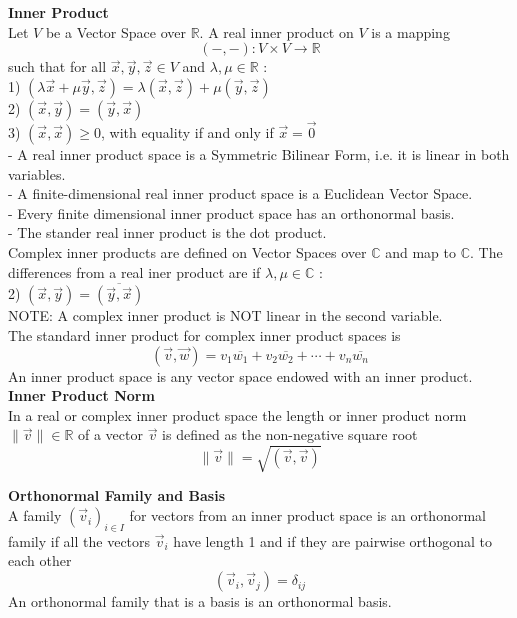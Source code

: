 \documentclass[a4paper, 10pt]{article}
\begin{document}
\begin{multicols*}{3}
\textbf{Inner Product}\\
Let $V$ be a Vector Space over $\mathbb{R}$. A real inner product on $V$ is a mapping
$$
(-,-): V \times V \rightarrow \mathbb{R}
$$
such that for all $\vec{x}, \vec{y}, \vec{z} \in V$ and $\lambda, \mu \in \mathbb{R}$ :\\
1) $(\lambda \vec{x}+\mu \vec{y}, \vec{z})=\lambda(\vec{x}, \vec{z})+\mu(\vec{y}, \vec{z})$\\
2) $(\vec{x}, \vec{y})=(\vec{y}, \vec{x})$\\
3) $(\vec{x}, \vec{x}) \geqslant 0$, with equality if and only if $\vec{x}=\overrightarrow{0}$\\
- A real inner product space is a Symmetric Bilinear Form, i.e. it is linear in both variables.\\
- A finite-dimensional real inner product space is a Euclidean Vector Space.\\
- Every finite dimensional inner product space has an orthonormal basis. \\
- The stander real inner product is the dot product.\\
Complex inner products are defined on Vector Spaces over $\mathbb{C}$ and map to $\mathbb{C}$. 
The differences from a real iner product are if $\lambda, \mu \in \mathbb{C}$ :\\
2) $(\vec{x}, \vec{y})=\overline{(\vec{y}, \vec{x})}$\\
NOTE: A complex inner product is NOT linear in the second variable.\\
The standard inner product for complex inner product spaces is
$$
(\vec{v}, \vec{w})=v_1 \overline{w_1}+v_2 \overline{w_2}+\cdots+v_n \overline{w_n}
$$
An inner product space is any vector space endowed with an inner product.\\

\textbf{Inner Product Norm}\\
In a real or complex inner product space the length or inner product norm $\|\vec{v}\| \in \mathbb{R}$ of a vector $\vec{v}$ is defined as the non-negative square root
$$
\|\vec{v}\|=\sqrt{(\vec{v}, \vec{v})}
$$

\textbf{Orthonormal Family and Basis}\\
A family $\left(\vec{v}_i\right)_{i \in I}$ for vectors from an inner product space is an orthonormal family if all the vectors $\vec{v}_i$ have length 1 and if they are pairwise orthogonal to each other
$$
\left(\vec{v}_i, \vec{v}_j\right)=\delta_{i j}
$$
An orthonormal family that is a basis is an orthonormal basis.


\end{multicols*}
\end{document}
